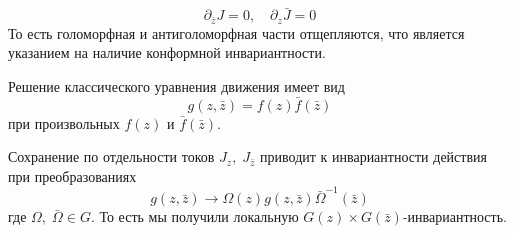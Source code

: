 \begin{equation}
  \label{eq:100}
  \partial_{\bar z}J=0,\quad \partial_z \bar J=0
\end{equation}
То есть голоморфная и антиголоморфная части отщепляются, что является указанием на наличие
конформной инвариантности.

Решение классического уравнения движения имеет вид
\begin{equation}
  \label{eq:80}
  g(z,\bar z)=f(z)\bar f(\bar z)
\end{equation}
при произвольных $f(z)$ и $\bar f (\bar z)$.

Сохранение по отдельности токов $J_z,\; J_{\bar z}$ приводит к инвариантности действия при преобразованиях
\begin{equation}
  \label{eq:81}
   g(z,\bar z)\to \Omega(z)g(z,\bar z)\bar \Omega^{-1}(\bar z)
\end{equation}
где $\Omega,\;\bar \Omega \in G$. То есть мы получили локальную $G(z)\times G(\bar z)$-инвариантность.

